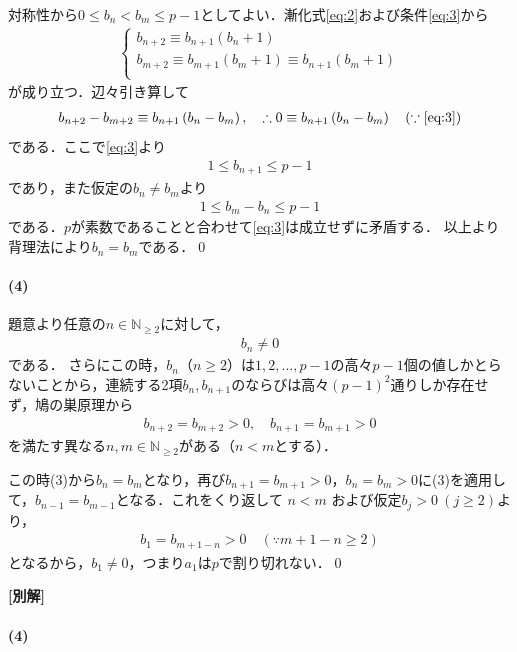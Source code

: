 \documentclass[../../main.tex]{subfiles}
\begin{document}
対称性から$0\le b_n<b_m\le p-1$としてよい．漸化式\cref{eq:2}および条件\cref{eq:3}から
\begin{align}
  \begin{cases}
    b_{n+2} \equiv b_{n+1}(b_n+1)\\
    b_{m+2} \equiv b_{m+1}(b_m+1) \equiv b_{n+1}(b_m+1) \\
  \end{cases}
\end{align}
が成り立つ．辺々引き算して
\begin{align}
  b_{n+2}-b_{m+2} \equiv b_{n+1}\left(b_n-b_m\right), \quad
  \therefore
  0 \equiv b_{n+1}\left(b_n-b_m\right) \quad (\because\text{\cref{eq:3}}) \label{eq:4}
\end{align}
である．ここで\cref{eq:3}より
\begin{align}
  1 \le b_{n+1} \le p-1
\end{align}
であり，また仮定の$b_n \neq b_m$より
\begin{align}
  1 \le b_{m}-b_{n} \le p-1
\end{align}
である．$p$が素数であることと合わせて\cref{eq:3}は成立せずに矛盾する．
以上より背理法により$b_n=b_m$である．\qed

\paragraph{(4)}

題意より任意の$n\in\mathbb N_{\ge2}$に対して，
\begin{align}
  b_n \neq 0 \label{eq:5}
\end{align}
である．
さらにこの時，$b_n$（$n\ge2$）は$1,2,\ldots,p-1$の高々$p-1$個の値しかとらないことから，連続する2項$b_n,b_{n+1}$のならびは高々$(p-1)^2$通りしか存在せず，鳩の巣原理から
\begin{align}
  b_{n+2}=b_{m+2}>0,\quad b_{n+1}=b_{m+1}>0
\end{align}
を満たす異なる$n,m\in\mathbb N_{\ge2}$がある（$n<m$とする）．

この時(3)から$b_n=b_m$となり，再び$b_{n+1}=b_{m+1}>0$，$b_n=b_m>0$に(3)を適用して，$b_{n-1}=b_{m-1}$となる．これをくり返して $n<m$ および仮定$b_j>0 \ (j \ge 2)$より，
\begin{align}
  b_1=b_{m+1-n}>0\quad(\because m+1-n \ge 2)
\end{align}
となるから，$b_1\ne0$，つまり$a_1$は$p$で割り切れない．\qed

{\bf [別解]}
\paragraph{(4)}
\end{document}
